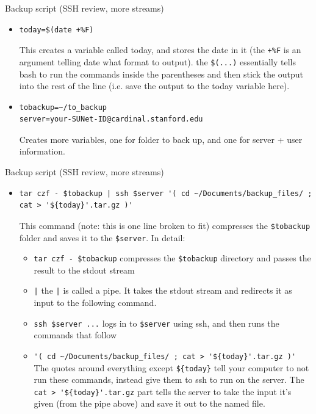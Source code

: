 \documentclass{beamer}
\begin{document}
\begin{frame}[fragile]{Backup script (SSH review, more streams)}
\begin{itemize}
\item
\begin{lstlisting}
today=$(date +%F)
\end{lstlisting}
This creates a variable called today, and stores the date in it (the \lstinline|+%F| is an argument telling date what format to output). the \lstinline|$(...)| essentially tells bash to run the commands inside the parentheses and then stick the output into the rest of the line (i.e. save the output to the today variable here). 
\item
\begin{lstlisting}
tobackup=~/to_backup
server=your-SUNet-ID@cardinal.stanford.edu
\end{lstlisting}
Creates more variables, one for folder to back up, and one for server + user information.
\end{itemize}
\end{frame}

\begin{frame}[fragile]{Backup script (SSH review, more streams)}
\begin{itemize}
\item
\begin{lstlisting}
tar czf - $tobackup | ssh $server '( cd ~/Documents/backup_files/ ; cat > '${today}'.tar.gz )'
\end{lstlisting}
This command (note: this is one line broken to fit) compresses the \lstinline|$tobackup| folder and saves it to the \lstinline|$server|. In detail: 
\begin{itemize}
    \item<1-> \lstinline|tar czf - $tobackup| compresses the \lstinline|$tobackup| directory and passes the result to the stdout stream
    \item<2-> \lstinline!|! the \lstinline!|! is called a pipe. It takes the stdout stream and redirects it as input to the following command. 
    \item<3-> \lstinline|ssh $server ...| logs in to \lstinline|$server| using ssh, and then runs the commands that follow
    \item<4-> \lstinline|'( cd ~/Documents/backup_files/ ; cat > '${today}'.tar.gz )'| The quotes around everything except \lstinline|${today}| tell your computer to not run these commands, instead give them to ssh to run on the server. The \lstinline|cat > '${today}'.tar.gz| part tells the server to take the input it's given (from the pipe above) and save it out to the named file.
\end{itemize}
\end{itemize}
\end{frame}
\end{document}
